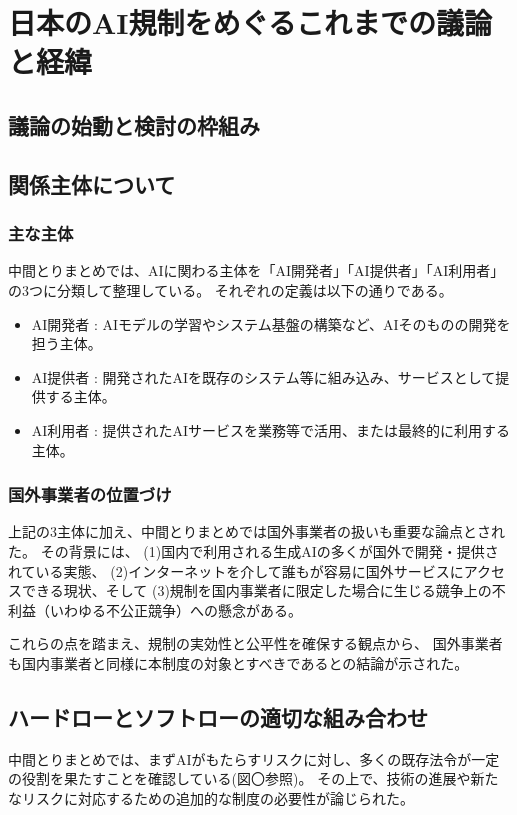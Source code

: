 \chapter{日本のAI規制をめぐるこれまでの議論と経緯}

\section{議論の始動と検討の枠組み}

\section{関係主体について}

\subsection{主な主体}
中間とりまとめでは、AIに関わる主体を「AI開発者」「AI提供者」「AI利用者」の3つに分類して整理している。
それぞれの定義は以下の通りである。

\begin{itemize}
  \item AI開発者 : AIモデルの学習やシステム基盤の構築など、AIそのものの開発を担う主体。
  \item AI提供者 : 開発されたAIを既存のシステム等に組み込み、サービスとして提供する主体。
  \item AI利用者 : 提供されたAIサービスを業務等で活用、または最終的に利用する主体。
\end{itemize}

\subsection{国外事業者の位置づけ}
上記の3主体に加え、中間とりまとめでは国外事業者の扱いも重要な論点とされた。
その背景には、
(1)国内で利用される生成AIの多くが国外で開発・提供されている実態、
(2)インターネットを介して誰もが容易に国外サービスにアクセスできる現状、そして
(3)規制を国内事業者に限定した場合に生じる競争上の不利益（いわゆる不公正競争）への懸念がある。

これらの点を踏まえ、規制の実効性と公平性を確保する観点から、
国外事業者も国内事業者と同様に本制度の対象とすべきであるとの結論が示された。


\section{ハードローとソフトローの適切な組み合わせ}
中間とりまとめでは、まずAIがもたらすリスクに対し、多くの既存法令が一定の役割を果たすことを確認している(図〇参照)。
その上で、技術の進展や新たなリスクに対応するための追加的な制度の必要性が論じられた。

